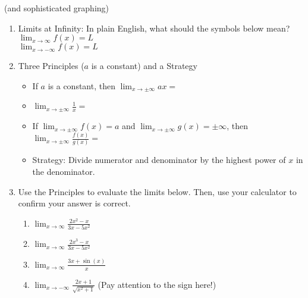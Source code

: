 \documentclass[11pt,fleqn]{article}
\begin{document}
\setlength{\parindent}{0cm}
\renewcommand{\headrulewidth}{0pt}
\newcommand{\blank}[1]{\rule{#1}{0.75pt}}
\renewcommand{\d}{\displaystyle}
\vspace*{-0.7in}
\begin{center}
 {\large{ }}
 (and sophisticated graphing)
\end{center}
 \begin{enumerate}
  \item Limits at Infinity: In plain English, what should the symbols below mean?\\
 
 $\displaystyle{\lim_{x \to \infty} f(x) = L }$ \\
 
 $\displaystyle{\lim_{x \to -\infty} f(x) = L }$\\
 
 \item Three Principles ($a$ is a constant) and a Strategy
 \begin{itemize}
 	\item If $a$ is a constant, then $\displaystyle{\lim_{x \to \pm\infty} ax=}$
 	\item $\displaystyle{\lim_{x \to \pm\infty} \frac{1}{x}=}$
	\item If $\displaystyle{\lim_{x \to \pm\infty} f(x)=a}$ and $\displaystyle{\lim_{x \to \pm\infty} {g(x)}= \pm \infty}$, then  $\displaystyle{\lim_{x \to \pm\infty} \frac{f(x)}{g(x)}=}$
	\item Strategy: Divide numerator and denominator by the highest power of $x$ in the denominator.
 \end{itemize}
 \item Use the Principles to evaluate the limits below. Then, use your calculator to confirm your answer is correct.
 	\begin{enumerate}
	\item $\displaystyle{\lim_{x \to \infty} \frac{2x^2-x}{3x-5x^2}}$
	\vfill	
	\item $\displaystyle{\lim_{x \to \infty} \frac{2x^3-x}{3x-5x^2}}$
	\vfill
	\item $\displaystyle{\lim_{x \to \infty} \frac{3x+ \sin(x)}{x}}$
	\vfill
	\item $\displaystyle{\lim_{x \to -\infty} \frac{2x+1}{\sqrt{x^2+1}}}$ (Pay attention to the sign here!)
	\vfill
	

\end{enumerate}
\end{enumerate}
\end{document}
